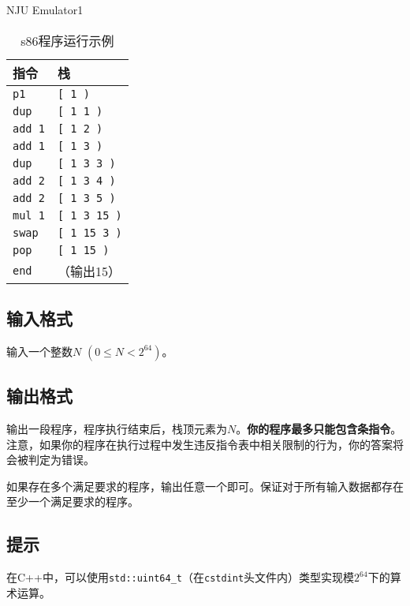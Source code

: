 \begin{Problem}{NJU Emulator}{1}
\begin{table}[htbp]
\centering
\begin{tabular}{ll}
\hline
指令 & 栈  \\ \hline
\texttt{p1} & \texttt{[ 1 )} \\ 
\texttt{dup} & \texttt{[ 1 1 )} \\
\texttt{add 1} & \texttt{[ 1 2 )} \\
\texttt{add 1} & \texttt{[ 1 3 )} \\
\texttt{dup} & \texttt{[ 1 3 3 )} \\
\texttt{add 2} & \texttt{[ 1 3 4 )} \\
\texttt{add 2} & \texttt{[ 1 3 5 )} \\
\texttt{mul 1} & \texttt{[ 1 3 15 )} \\
\texttt{swap} & \texttt{[ 1 15 3 )} \\
\texttt{pop} & \texttt{[ 1 15 )} \\
\texttt{end} & （输出15） \\ \hline
\end{tabular}
\caption{s86程序运行示例}
\end{table}

\subsection*{输入格式}

输入一个整数$N$ $(0 \leq N < 2^{64})$。

\subsection*{输出格式}

输出一段程序，程序执行结束后，栈顶元素为$N$。\textbf{你的程序最多只能包含条指令}。注意，如果你的程序在执行过程中发生违反指令表中相关限制的行为，你的答案将会被判定为错误。

如果存在多个满足要求的程序，输出任意一个即可。保证对于所有输入数据都存在至少一个满足要求的程序。

\setcounter{ExampleNo}{0}


\subsection*{提示}

在C++中，可以使用\verb|std::uint64_t|（在\texttt{cstdint}头文件内）类型实现模$2^{64}$下的算术运算。

\end{Problem}

